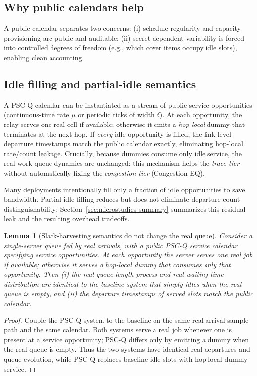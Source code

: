\documentclass[11pt]{article}
\newtheorem{lemma}{Lemma}
\theoremstyle{definition}
\theoremstyle{remark}
\begin{document}
\subsection{Why public calendars help}
A public calendar separates two concerns:
(i) schedule regularity and capacity provisioning are public and auditable;
(ii) secret-dependent variability is forced into controlled degrees of freedom (e.g., which cover items occupy idle slots), enabling clean accounting.

\subsection{Idle filling and partial-idle semantics}
A PSC-Q calendar can be instantiated as a stream of public service opportunities (continuous-time rate $\mu$ or periodic ticks of width $\delta$).
At each opportunity, the relay serves one real cell if available; otherwise it emits a \emph{hop-local} dummy that terminates at the next hop.
If \emph{every} idle opportunity is filled, the link-level departure timestamps match the public calendar exactly, eliminating hop-local rate/count leakage.
Crucially, because dummies consume only idle service, the real-work queue dynamics are unchanged: this mechanism helps the \emph{trace tier} without automatically fixing the \emph{congestion tier} (Congestion-EQ).

Many deployments intentionally fill only a fraction of idle opportunities to save bandwidth.
Partial idle filling reduces but does not eliminate departure-count distinguishability; Section~\ref{sec:microstudies-summary} summarizes this residual leak and the resulting overhead tradeoffs.

\begin{lemma}[Slack-harvesting semantics do not change the real queue]
Consider a single-server queue fed by \emph{real} arrivals, with a public PSC-Q service calendar specifying service opportunities.
At each opportunity the server serves one real job if available; otherwise it serves a hop-local dummy that consumes only that opportunity.
Then (i) the real-queue length process and real waiting-time distribution are identical to the baseline system that simply idles when the real queue is empty, and (ii) the departure timestamps of \emph{served slots} match the public calendar.
\end{lemma}

\begin{proof}
Couple the PSC-Q system to the baseline on the same real-arrival sample path and the same calendar.
Both systems serve a real job whenever one is present at a service opportunity; PSC-Q differs only by emitting a dummy when the real queue is empty.
Thus the two systems have identical real departures and queue evolution, while PSC-Q replaces baseline idle slots with hop-local dummy service.
\end{proof}
\end{document}
